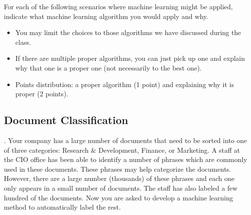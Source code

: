 \documentclass[addpoints,11pt]{exam}
\begin{document}
\begin{questions}
\newpage
\addpoints
\question[6] For each of the following scenarios where machine learning might be applied, indicate what machine learning algorithm you would apply and why.
\begin{itemize}
  \item You may limit the choices to those algorithms we have discussed during the class.
  \item If there are multiple proper algorithms, you can just pick up one and explain why that one is a proper one (not necessarily to the best one).
  \item Points distribution: a proper algorithm (1 point) and explaining why it is proper (2 points).
\end{itemize}

\noaddpoints
\begin{parts}

\part[3] {\textbf{Document Classification}}. Your company has a large number of documents that need to be
sorted into one of three categories: Research \& Development, Finance, or Marketing. A staff at the CIO office has been able to identify a number of phrases which are commonly used in these documents. These phrases may help categorize the documents. However, there are a large number (thousands) of these phrases and each one only appears in a small number of documents. The staff has also labeled a few hundred of the documents. Now you are asked to develop a machine learning method to automatically label the rest.
\vspace{2.5in}




\end{parts}
\end{questions}
\end{document}
